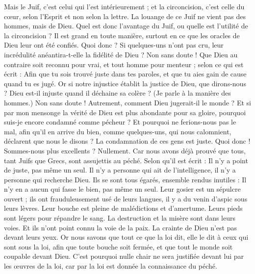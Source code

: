 \begin{multicols}{2}
Mais le Juif, c'est celui qui l'est intérieurement ; et la circoncision, c'est celle du cœur, selon l'Esprit et non selon la lettre. La louange de ce Juif ne vient pas des hommes, mais de Dieu.
\VerseOne{}Quel est donc l'avantage du Juif, ou quelle est l'utilité de la circoncision ?
Il est grand en toute manière, surtout en ce que les oracles de Dieu leur ont été confiés.
Quoi donc ? Si quelques-uns n'ont pas cru, leur incrédulité anéantira-t-elle la fidélité de Dieu ?
Non sans doute ! Que Dieu au contraire soit reconnu pour vrai, et tout homme pour menteur ; selon ce qui est écrit : Afin que tu sois trouvé juste dans tes paroles, et que tu aies gain de cause quand tu es jugé.
Or si notre injustice établit la justice de Dieu, que dirons-nous ? Dieu est-il injuste quand il déchaine sa colère ? (Je parle à la manière des hommes.)
Non sans doute ! Autrement, comment Dieu jugerait-il le monde ?
Et si par mon mensonge la vérité de Dieu est plus abondante pour sa gloire, pourquoi suis-je encore condamné comme pécheur ?
Et pourquoi ne ferions-nous pas le mal, afin qu'il en arrive du bien, comme quelques-uns, qui nous calomnient, déclarent que nous le disons ? La condamnation de ces gens est juste.
Quoi donc ! Sommes-nous plus excellents ? Nullement. Car nous avons déjà prouvé que tous, tant Juifs que Grecs, sont assujettis au péché.
Selon qu'il est écrit : Il n'y a point de juste, pas même un seul.
Il n'y a personne qui ait de l'intelligence, il n'y a personne qui recherche Dieu.
Ils se sont tous égarés, ensemble rendus inutiles : Il n'y en a aucun qui fasse le bien, pas même un seul.
Leur gosier est un sépulcre ouvert ; ils ont frauduleusement usé de leurs langues, il y a du venin d'aspic sous leurs lèvres.
Leur bouche est pleine de malédictions et d'amertume.
Leurs pieds sont légers pour répandre le sang.
La destruction et la misère sont dans leurs voies.
Et ils n'ont point connu la voie de la paix.
La crainte de Dieu n'est pas devant leurs yeux.
Or nous savons que tout ce que la loi dit, elle le dit à ceux qui sont sous la loi, afin que toute bouche soit fermée, et que tout le monde soit coupable devant Dieu.
C'est pourquoi nulle chair ne sera justifiée devant lui par les œuvres de la loi, car par la loi est donnée la connaissance du péché.

\end{multicols}
